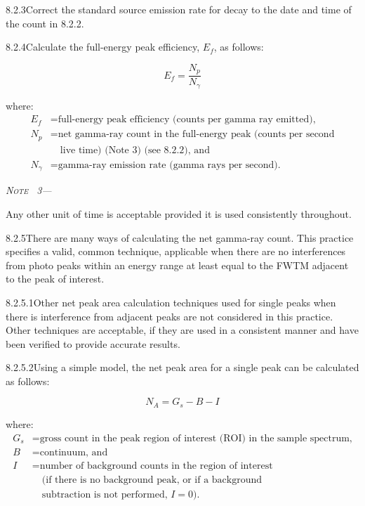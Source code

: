 \documentclass[12pt]{article}
\newenvironment{astmnote}[1][\relax]{%
  \par\smallskip\noindent\textit{N\textsc{ote}%
  \ifx#1\relax\else~#1\fi---}\ignorespaces
}{%
  \par\smallskip
}
\begin{document}
8.2.3\quad Correct the standard source emission rate for decay to the date and time of the
count in 8.2.2.

8.2.4\quad Calculate the full-energy peak efficiency, $E_f$, as follows:

\begin{equation}
  E_f = \frac{N_p}{N_\gamma}
  \label{eq:efficiency}
\end{equation}

\noindent where:
\begin{align*}
  E_f      &= \text{full-energy peak efficiency (counts per gamma ray emitted),}\\
  N_p      &= \text{net gamma-ray count in the full-energy peak (counts per second}\\
           &\quad\text{live time) (Note 3) (see 8.2.2), and}\\
  N_\gamma &= \text{gamma-ray emission rate (gamma rays per second).}
\end{align*}

\begin{astmnote}[3]
Any other unit of time is acceptable provided it is used consistently throughout.
\end{astmnote}

8.2.5\quad There are many ways of calculating the net gamma-ray count. This practice
specifies a valid, common technique, applicable when there are no interferences from photo
peaks within an energy range at least equal to the FWTM adjacent to the peak of interest.

8.2.5.1\quad Other net peak area calculation techniques used for single peaks when there
is interference from adjacent peaks are not considered in this practice. Other techniques
are acceptable, if they are used in a consistent manner and have been verified to provide
accurate results.

8.2.5.2\quad Using a simple model, the net peak area for a single peak can be calculated
as follows:

\begin{equation}
  N_A = G_s - B - I
  \label{eq:net_peak_area}
\end{equation}

\noindent where:
\begin{align*}
  G_s &= \text{gross count in the peak region of interest (ROI) in the sample spectrum,}\\
  B   &= \text{continuum, and}\\
  I   &= \text{number of background counts in the region of interest}\\
      &\quad\text{(if there is no background peak, or if a background}\\
      &\quad\text{subtraction is not performed, }I=0\text{).}
\end{align*}
\end{document}
